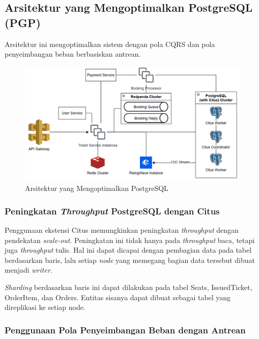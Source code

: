 \subsection{Arsitektur yang Mengoptimalkan PostgreSQL (PGP)}

Arsitektur ini mengoptimalkan sistem dengan pola CQRS dan pola penyeimbangan beban berbasiskan antrean.

\begin{figure}[htbp]
    \centering
    \includegraphics[width=1\textwidth]{resources/appendix/architecture-optimized.png}
    \caption{Arsitektur yang Mengoptimalkan PostgreSQL}
    \label{fig:optimized-architecture}
\end{figure}

\subsubsection{Peningkatan \textit{Throughput} PostgreSQL dengan Citus}

Penggunaan ekstensi Citus memungkinkan peningkatan \textit{throughput} dengan pendekatan \textit{scale-out}. Peningkatan ini tidak hanya pada \textit{throughput} baca, tetapi juga \textit{throughput} tulis. Hal ini dapat dicapai dengan pembagian data pada tabel berdasarkan baris, lalu setiap \textit{node} yang memegang bagian data tersebut dibuat menjadi \textit{writer}.

\textit{Sharding} berdasarkan baris ini dapat dilakukan pada tabel Seats, IssuedTicket, OrderItem, dan Orders. Entitas sisanya dapat dibuat sebagai tabel yang direplikasi ke setiap node.

\subsubsection{Penggunaan Pola Penyeimbangan Beban dengan Antrean}

